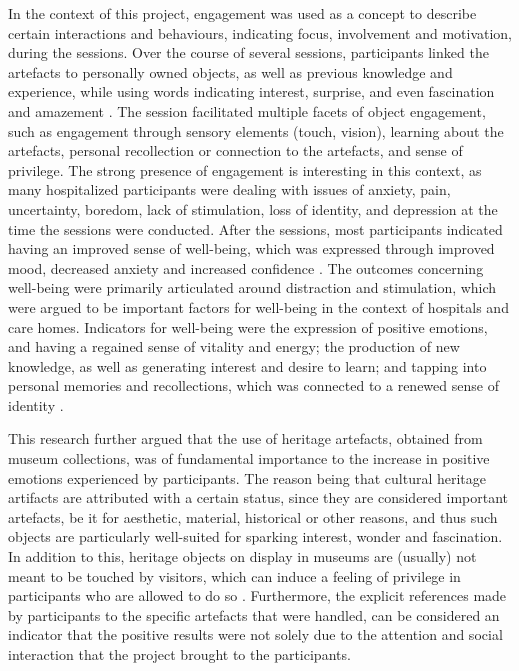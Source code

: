 	In the context of this project, engagement was used as a concept to describe certain interactions and behaviours, indicating focus, involvement and motivation, during the sessions. Over the course of several sessions, participants linked the artefacts to personally owned objects, as well as previous knowledge and experience, while using words indicating interest, surprise, and even fascination and amazement \parencite[234]{AnderE_2013}. The session facilitated multiple facets of object engagement, such as engagement through sensory elements (touch, vision), learning about the artefacts, personal recollection or connection to the artefacts, and sense of privilege. The strong presence of engagement is interesting in this context, as many hospitalized participants were dealing with issues of anxiety, pain, uncertainty, boredom, lack of stimulation, loss of identity, and depression at the time the sessions were conducted. After the sessions, most participants indicated having an improved sense of well-being, which was expressed through improved mood, decreased anxiety and increased confidence \parencite[234--235]{AnderE_2013}. 
	The outcomes concerning well-being were primarily articulated around distraction and stimulation, which were argued to be important factors for well-being in the context of hospitals and care homes. Indicators for well-being were the expression of positive emotions, and having a regained sense of vitality and energy; the production of new knowledge, as well as generating interest and desire to learn; and tapping into personal memories and recollections, which was connected to a renewed sense of identity \parencite[235--236]{AnderE_2013}.
									
	This research further argued that the use of heritage artefacts, obtained from museum collections, was of fundamental importance to the increase in positive emotions experienced by participants. The reason being that cultural heritage artifacts are attributed with a certain status, since they are considered important artefacts, be it for aesthetic, material, historical or other reasons, and thus such objects are particularly well-suited for sparking interest, wonder and fascination. In addition to this, heritage objects on display in museums are (usually) not meant to be touched by visitors, which can induce a feeling of privilege in participants who are allowed to do so \parencite[240]{AnderE_2013}. Furthermore, the explicit references made by participants to the specific artefacts that were handled, can be considered an indicator that the positive results were not solely due to the attention and social interaction that the project brought to the participants.	
	
